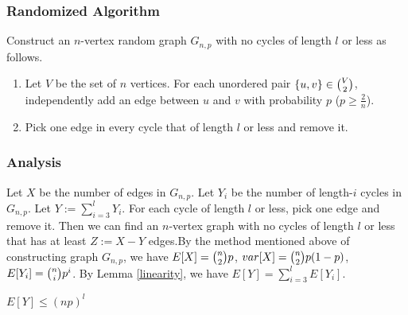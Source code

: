 \subsubsection{Randomized Algorithm}
Construct an $n$-vertex random graph $G_{n,p}$ with no cycles of length $l$ or less as follows. 
\begin{enumerate}
    \item Let $V$ be the set of $n$ vertices. For each unordered pair $\{u,v\}\in \tbinom{V}{2}$, independently add an edge between $u$ and $v$ with probability $p$ ($p\ge \frac{2}{n}$).
    \item Pick one edge in every cycle that of length $l$ or less and remove it.
\end{enumerate}

\subsubsection{Analysis} 
Let $X$ be the number of edges in $G_{n,p}$. Let $Y_i$ be the number of length-$i$ cycles in $G_{n,p}$. Let $Y:=\sum_{i=3}^{l}Y_i$.
For each cycle of length $l$ or less, pick one edge and remove it.
Then we can find an $n$-vertex graph with no cycles of length $l$ or less that has at least $Z:=X-Y$ edges.By the method mentioned above of constructing graph $G_{n,p}$, we have $E[X]=\tbinom{n}{2}p$, $var[X]=\tbinom{n}{2}p(1-p)$, $E[Y_i]=\tbinom{n}{i}p^i$. By Lemma \ref{linearity}, we have $E[Y]=\sum_{i=3}^{l}E[Y_i]$.
\begin{claim}
$E[Y]\le (np)^l$
\end{claim}
